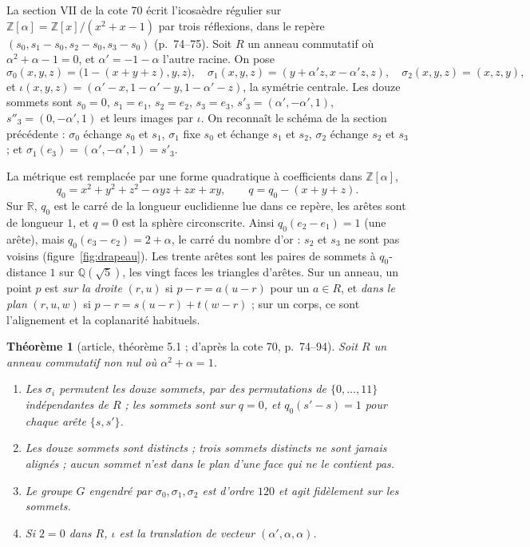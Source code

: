 \documentclass[11pt,a4paper]{amsart}
\theoremstyle{definition}
\theoremstyle{plain}
\newtheorem{theoreme}{Théorème}
\theoremstyle{remark}
\newcommand{\Z}{\mathbb Z}
\newcommand{\Q}{\mathbb Q}
\newcommand{\R}{\mathbb R}
\begin{document}
La section VII de la cote 70 écrit l'icosaèdre régulier sur $\Z[\alpha] = \Z[x]/(x^2 + x - 1)$ par trois réflexions, dans le repère $(s_0, s_1 - s_0, s_2 - s_0, s_3 - s_0)$ (p.~74--75). Soit $R$ un anneau commutatif où $\alpha^2 + \alpha - 1 = 0$, et $\alpha' = -1 - \alpha$ l'autre racine. On pose
\[
\sigma_0(x,y,z) = \bigl(1 - (x+y+z), y, z\bigr),\quad \sigma_1(x,y,z) = (y + \alpha'z, x - \alpha'z, z),\quad \sigma_2(x,y,z) = (x, z, y),
\]
et $\iota(x,y,z) = (\alpha' - x, 1 - \alpha' - y, 1 - \alpha' - z)$, la symétrie centrale. Les douze sommets sont $s_0 = 0$, $s_1 = e_1$, $s_2 = e_2$, $s_3 = e_3$, $s'_3 = (\alpha', -\alpha', 1)$, $s''_3 = (0, -\alpha', 1)$ et leurs images par $\iota$. On reconnaît le schéma de la section précédente : $\sigma_0$ échange $s_0$ et $s_1$, $\sigma_1$ fixe $s_0$ et échange $s_1$ et $s_2$, $\sigma_2$ échange $s_2$ et $s_3$ ; et $\sigma_1(e_3) = (\alpha', -\alpha', 1) = s'_3$.

La métrique est remplacée par une forme quadratique à coefficients dans $\Z[\alpha]$,
\[
q_0 = x^2 + y^2 + z^2 - \alpha yz + zx + xy, \qquad q = q_0 - (x + y + z).
\]
Sur $\R$, $q_0$ est le carré de la longueur euclidienne lue dans ce repère, les arêtes sont de longueur $1$, et $q = 0$ est la sphère circonscrite. Ainsi $q_0(e_2 - e_1) = 1$ (une arête), mais $q_0(e_3 - e_2) = 2 + \alpha$, le carré du nombre d'or : $s_2$ et $s_3$ ne sont pas voisins (figure~\ref{fig:drapeau}). Les trente arêtes sont les paires de sommets à $q_0$-distance $1$ sur $\Q(\sqrt5)$, les vingt faces les triangles d'arêtes. Sur un anneau, un point $p$ est \emph{sur la droite} $(r, u)$ si $p - r = a(u - r)$ pour un $a \in R$, et \emph{dans le plan} $(r, u, w)$ si $p - r = s(u - r) + t(w - r)$ ; sur un corps, ce sont l'alignement et la coplanarité habituels.

\begin{theoreme}[article, théorème 5.1 ; d'après la cote 70, p.~74--94]\label{thm:fidele}
Soit $R$ un anneau commutatif non nul où $\alpha^2 + \alpha = 1$.
\begin{enumerate}
\item Les $\sigma_i$ permutent les douze sommets, par des permutations de $\{0, \dots, 11\}$ indépendantes de $R$ ; les sommets sont sur $q = 0$, et $q_0(s' - s) = 1$ pour chaque arête $\{s, s'\}$.
\item Les douze sommets sont distincts ; trois sommets distincts ne sont jamais alignés ; aucun sommet n'est dans le plan d'une face qui ne le contient pas.
\item Le groupe $G$ engendré par $\sigma_0, \sigma_1, \sigma_2$ est d'ordre $120$ et agit fidèlement sur les sommets.
\item Si $2 = 0$ dans $R$, $\iota$ est la translation de vecteur $(\alpha', \alpha, \alpha)$.
\end{enumerate}
\end{theoreme}
\end{document}

